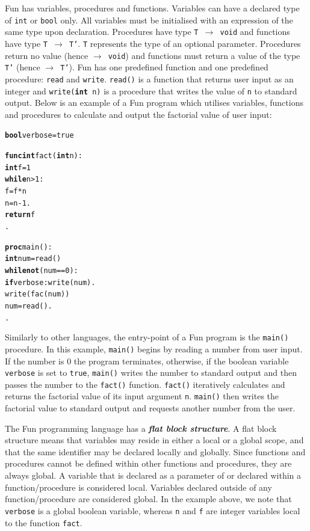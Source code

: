 \documentclass{l4proj}
\begin{document}
Fun has variables, procedures and functions. Variables can have a declared type of \texttt{int} or \texttt{bool} only. All variables must be initialised with an expression of the same type upon declaration. Procedures have type \texttt{T $\rightarrow$ void} and functions have type \texttt{T $\rightarrow$ T'}. \texttt{T} represents the type of an optional parameter. Procedures return no value (hence \texttt{$\rightarrow$ void}) and functions must return a value of the type \texttt{T'} (hence \texttt{$\rightarrow$ T'}). Fun has one predefined function and one predefined procedure: \texttt{read} and \texttt{write}. \texttt{read()} is a function that returns user input as an integer and \texttt{write(\textbf{int} n)} is a procedure that writes the value of \texttt{n} to standard output. Below is an example of a Fun program which utilises variables, functions and procedures to calculate and output the factorial value of user input:
\begin{alltt}
\textbf{bool} verbose = true

\textbf{func int} fact(\textbf{int} n):    
    \textbf{int} f = 1   
    \textbf{while} n > 1:    
        f = f*n   
        n = n-1  .   
    \textbf{return} f  
.  

\textbf{proc} main():  
    \textbf{int} num = read()   
    \textbf{while not} (num == 0):    
        \textbf{if} verbose: write(num) .    
        write(fac(num))    
        num = read() .  
.
 \end{alltt}
 
Similarly to other languages, the entry-point of a Fun program is the \texttt{main()} procedure. In this example, \texttt{main()} begins by reading a number from user input. If the number is 0 the program terminates, otherwise, if the boolean variable \texttt{verbose} is set to \texttt{true}, \texttt{main()} writes the number to standard output and then passes the number to the \texttt{fact()} function. \texttt{fact()} iteratively calculates and returns the factorial value of its input argument \texttt{n}. \texttt{main()} then writes the factorial value to standard output and requests another number from the user.
 
The Fun programming language has a \textit{\textbf{flat block structure}}. A flat block structure means that variables may reside in either a local or a global scope, and that the same identifier may be declared locally and globally. Since functions and procedures cannot be defined within other functions and procedures, they are always global. A variable that is declared as a parameter of or declared within a function/procedure is considered local. Variables declared outside of any function/procedure are considered global. In the example above, we note that \texttt{verbose} is a global boolean variable, whereas \texttt{n} and \texttt{f} are integer variables local to the function \texttt{fact}.
\end{document}
